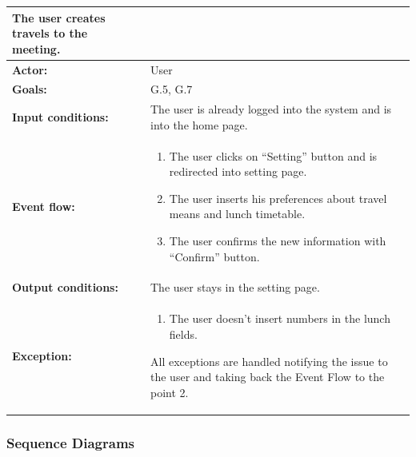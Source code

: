 \begin{tabular} { p{5cm} p{8cm} }
\textbf{The user creates travels to the meeting.} \\
\hline
\textbf{Actor:} & User \\ 
\textbf{Goals:} & G.5, G.7 \\ 
\textbf{Input conditions:} & The user is already logged into the system and is into the home page. \\
\textbf{Event flow:} & \begin{enumerate}
				\item
				The user clicks on “Setting” button and is redirected into setting page.
				\item
				The user inserts his preferences about travel means and lunch timetable.
				\item
				The user confirms the new information with “Confirm” button.
			\end{enumerate}\\ 
\textbf{Output conditions:} & The user stays in the setting page.\\ 
\textbf{Exception:} & \begin{enumerate}
				\item
				The user doesn’t insert numbers in the lunch fields.
			\end{enumerate}
All exceptions are handled notifying the issue to the user and taking back the Event Flow to the point 2. \\
\hline
\end{tabular}


\subsubsection{Sequence Diagrams}
